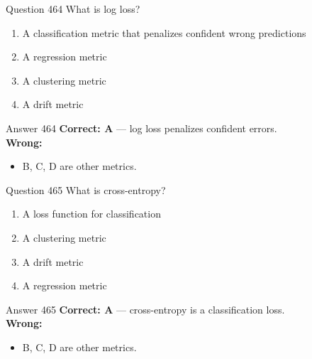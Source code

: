 \documentclass[aspectratio=169,11pt]{beamer}
\begin{document}
	\begin{frame}{Question 464}
		What is log loss?
		\begin{enumerate}[label=\Alph*.]
			\item A classification metric that penalizes confident wrong predictions
			\item A regression metric
			\item A clustering metric
			\item A drift metric
		\end{enumerate}
	\end{frame}
	\begin{frame}{Answer 464}
		\textbf{Correct: A} --- log loss penalizes confident errors.\\
		\vspace{0.5em}
		\textbf{Wrong:}
		\begin{itemize}
			\item B, C, D are other metrics.
		\end{itemize}
	\end{frame}
	
	\begin{frame}{Question 465}
		What is cross-entropy?
		\begin{enumerate}[label=\Alph*.]
			\item A loss function for classification
			\item A clustering metric
			\item A drift metric
			\item A regression metric
		\end{enumerate}
	\end{frame}
	\begin{frame}{Answer 465}
		\textbf{Correct: A} --- cross-entropy is a classification loss.\\
		\vspace{0.5em}
		\textbf{Wrong:}
		\begin{itemize}
			\item B, C, D are other metrics.
		\end{itemize}
	\end{frame}
	
\end{document}
